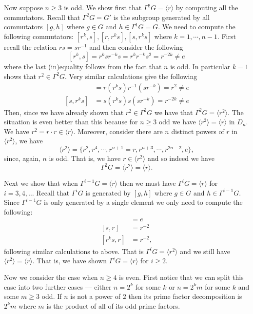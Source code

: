 \documentclass[12pt,letterpaper,boxed]{hmcpset}
\newcommand{\inv}{^{-1}}
\newcommand{\anglee}[1]{\langle #1 \rangle}
\begin{document}
\begin{solution}
Now suppose $n \geq 3$ is odd. We show first that $\Gamma^2 G =
\langle r \rangle$ by computing all the commutators. Recall that
$\Gamma^2 G = G'$ is the subgroup generated by all commutators $[g,h]$
where $g \in G$ and $h \in \Gamma^1 G = G$. We need to compute the
following commutators: $[r^k,s], [r,r^ks], [s,r^ks]$ where $k = 1,
\cdots, n-1$. First recall the relation $rs = s r\inv$ and then
consider the following \[
	[r^k, s] = r^k s r^{-k} s = r^k r^{-k} s^2 = r^{-2k} \neq e
\]
where the last (in)equality follows from the fact that $n$ is odd.
In particular $k=1$ shows that $r^2 \in \Gamma^2 G$. 
Very similar calculations give the following
\begin{align*}
	[r, r^ks] &= r (r^k s) r\inv (s r^{-k}) = r^2 \neq e \\
	[s, r^ks] &= s(r^k s) s (s r^{-k}) = r^{-2k} \neq e
\end{align*}
Then, since we have already shown that $r^2 \in \Gamma^2 G$ we have
that $\Gamma^2 G = \langle r^2 \rangle$. The situation is even better
than this because for $n \geq 3$ odd we have $\langle r^2 \rangle =
\langle r \rangle$ in $D_n$. We have $r^2 = r \cdot r \in \langle r \rangle$.
Moreover, consider there are $n$ distinct powers of $r$ in $\langle
r^2 \rangle$, we have \[
\langle r^2 \rangle = \{r^2, r^4, \cdots, r^{n + 1} = r, r^{n+3}, \cdots,
r^{2n-2}, e\},
\]
since, again, $n$ is odd. That is, we have $r \in \langle r^2 \rangle$
and so indeed we have \[
	\Gamma^2 G = \langle r^2 \rangle = \langle r \rangle.
\]

Next we show that when $\Gamma^{i-1} G = \langle r \rangle$  then we
must have $\Gamma^i G = \anglee r$ for $i = 3, 4, \dots$ 
Recall that $\Gamma^i G$ is generated by $[g,h]$ where $g \in G$ and
$h \in \Gamma^{i-1}G$. Since $\Gamma^{i-1}G$ is only generated by a
single element we only need to compute the following:
\begin{align*}
	[r^k, r] &= e\\
	[s, r] &= r^{-2}\\
	[r^ks, r] &= r^{-2},
\end{align*}
following similar calculations to above. That is $\Gamma^i G = \anglee
{r^2}$ and we still have $\anglee{r^2} = \anglee r$.
That is, we have shown $\Gamma^i G = \anglee r$ for $i \geq 2$. 

Now we consider the case when $n \geq 4$ is even. First notice that we
can split this case into two further cases --- either $n = 2^k$ for
some $k$ or $n = 2^km$ for some $k$ and some $m \geq 3$ odd. If $n$ is
not a power of $2$ then its prime factor decomposition is $2^k m$
where $m$ is the product of all of its odd prime factors.


\end{solution}
\end{document}
